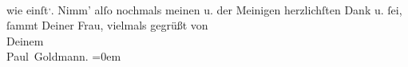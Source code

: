 \begin{ledgroupsized}[t]{13cm}
               wie einſt\substVorne{}\textsuperscript{,}\substDazwischen{}.\substHinten{}\pend
           \pstart
           Nimm’ alſo nochmals meinen u. der Meinigen herzlichſten Dank u. ſei, ſammt
               Deiner Frau, vielmals gegrüßt
               von {\\[\baselineskip]}Deinem {\\[\baselineskip]}\spacefill\mbox{Paul Goldmann.}\pend
           \leftskip=0em{}
         
         \endnumbering{}\end{ledgroupsized}  \newcommand{\dateiname}{L03254}\newcommand{\titel}{Paul Goldmann an Arthur Schnitzler, 7. 7. 1907}\newcommand{\editorInnen}{Martin Anton Müller und Laura Untner}
      